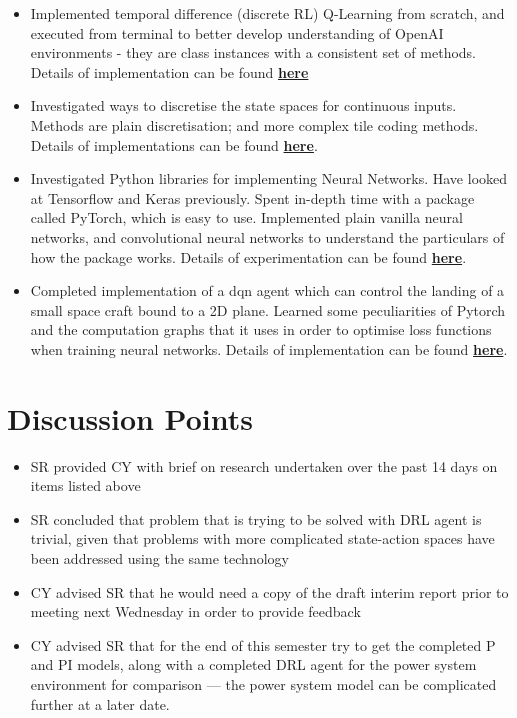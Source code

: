 \documentclass[12pt]{article}
\begin{document}
\begin{itemize}
		\item Implemented temporal difference (discrete RL) Q-Learning from scratch, and executed from terminal to better develop understanding of OpenAI environments - they are class instances with a consistent set of methods. Details of implementation can be found \href{https://github.com/skreynolds/RLND_openai_taxi_v2}{\textbf{here}}
		\item Investigated ways to discretise the state spaces for continuous inputs. Methods are plain discretisation; and more complex tile coding methods. Details of implementations can be found \href{https://github.com/skreynolds/RLND_discretisation}{\textbf{here}}.
		\item Investigated Python libraries for implementing Neural Networks. Have looked at Tensorflow and Keras previously. Spent in-depth time with a package called PyTorch, which is easy to use. Implemented plain vanilla neural networks, and convolutional neural networks to understand the particulars of how the package works. Details of experimentation can be found \href{https://github.com/skreynolds/RLND_pytorch_introduction}{\textbf{here}}.
		\item Completed implementation of a dqn agent which can control the landing of a small space craft bound to a 2D plane. Learned some peculiarities of Pytorch and the computation graphs that it uses in order to optimise loss functions when training neural networks. Details of implementation can be found \href{https://github.com/skreynolds/RLND_dqn}{\textbf{here}}.
	\end{itemize}
	
	\section{Discussion Points}
	\begin{itemize}
		\item SR provided CY with brief on research undertaken over the past 14 days on items listed above
		\item SR concluded that problem that is trying to be solved with DRL agent is trivial, given that problems with more complicated state-action spaces have been addressed using the same technology
		\item CY advised SR that he would need a copy of the draft interim report prior to meeting next Wednesday in order to provide feedback
		\item CY advised SR that for the end of this semester try to get the completed P and PI models, along with a completed DRL agent for the power system environment for comparison --- the power system model can be complicated further at a later date.
	\end{itemize}
	
\end{document}
